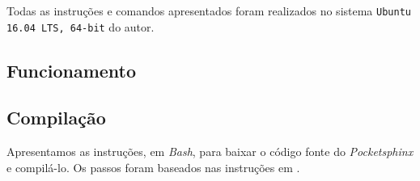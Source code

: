 Todas as instruções e comandos apresentados foram realizados no sistema \texttt{Ubuntu 16.04 LTS, 64-bit} do autor.


\subsection{Funcionamento}


\subsection{Compilação}

Apresentamos as instruções, em \textit{Bash}, para baixar o código fonte do \textit{Pocketsphinx} e compilá-lo. Os passos foram baseados nas instruções em \citep{pocketsphinxInstall}.

